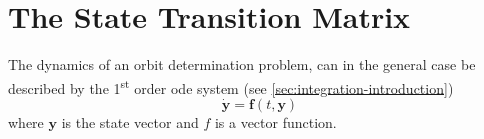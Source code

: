 \section{The State Transition Matrix}\label{sec:state-transition-matrix}

The dynamics of an orbit determination problem, can in the general case be 
described by the 1\textsuperscript{st} order \gls{ode} system (see
\autoref{sec:integration-introduction})
\begin{equation}\label{eq:tapley421}
  \bm{\dot{y}} = \bm{f}(t, \bm{y})
\end{equation}
where $\bm{y}$ is the state vector and $f$ is a vector function.
